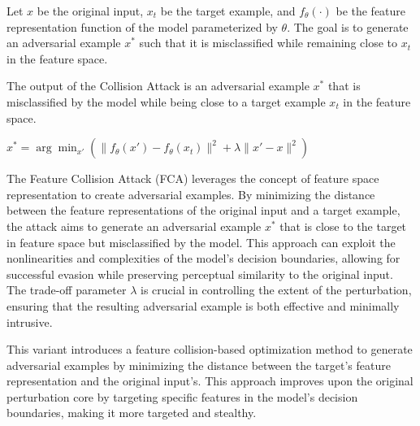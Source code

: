 Let $x$ be the original input, $x_t$ be the target example, and $f_\theta(\cdot)$ be the feature representation function of the model parameterized by $\theta$. The goal is to generate an adversarial example $x^*$ such that it is misclassified while remaining close to $x_t$ in the feature space.


The output of the Collision Attack is an adversarial example $x^*$ that is misclassified by the model while being close to a target example $x_t$ in the feature space.

$x^* = \arg\min_{x'} \left( \|f_\theta(x') - f_\theta(x_t)\|^2 + \lambda \|x' - x\|^2 \right)$

The Feature Collision Attack (FCA) leverages the concept of feature space representation to create adversarial examples. By minimizing the distance between the feature representations of the original input and a target example, the attack aims to generate an adversarial example $x^*$ that is close to the target in feature space but misclassified by the model. This approach can exploit the nonlinearities and complexities of the model's decision boundaries, allowing for successful evasion while preserving perceptual similarity to the original input. The trade-off parameter $\lambda$ is crucial in controlling the extent of the perturbation, ensuring that the resulting adversarial example is both effective and minimally intrusive.

This variant introduces a feature collision-based optimization method to generate adversarial examples by minimizing the distance between the target's feature representation and the original input's. This approach improves upon the original perturbation core by targeting specific features in the model's decision boundaries, making it more targeted and stealthy.